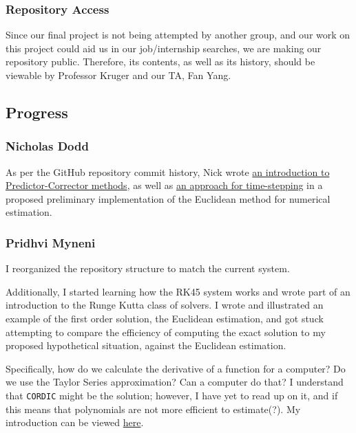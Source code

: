 \documentclass[12pt, letterpaper]{article}
\begin{document}
\subsubsection{Repository Access}
Since our final project is not being attempted by another group,  and our work on this project could aid us in our job/internship searches, we are making our repository public. Therefore, its contents, as well as its history, should be viewable by Professor Kruger and our TA, Fan Yang.

\subsection{Progress}
\subsubsection{Nicholas Dodd}
As per the GitHub repository commit history, Nick wrote \href{https://github.com/PMARINA/CPE593-FinalProject/blob/f8c679ad0c435e2d89354a87e111404e5477b096/Predictor\%20Corrector.pdf}{an introduction to Predictor-Corrector methods}, as well as \href{https://github.com/PMARINA/CPE593-FinalProject/blob/f8c679ad0c435e2d89354a87e111404e5477b096/Simple\%20Approach\%20For\%20Stepping\%20Time\%20Using\%20Euler.pdf}{an approach for time-stepping} in a proposed preliminary implementation of the Euclidean method for numerical estimation.

\subsubsection{Pridhvi Myneni}
I reorganized the repository structure to match the current system.

Additionally, I started learning how the RK45 system works and wrote part of an introduction to the Runge Kutta class of solvers. I wrote and illustrated an example of the first order solution, the Euclidean estimation, and got stuck attempting to compare the efficiency of computing the exact solution to my proposed hypothetical situation, against the Euclidean estimation.

Specifically, how do we calculate the derivative of a function for a computer? Do we use the Taylor Series approximation? Can a computer do that? I understand that \texttt{CORDIC} might be the solution; however, I have yet to read up on it, and if this means that polynomials are not more efficient to estimate(?). My introduction can be viewed \href{https://github.com/PMARINA/CPE593-FinalProject/blob/9ab5c29673f9862f02e62eb5c33648d52db2cf95/docs/RK45.pdf}{here}.
\end{document}

